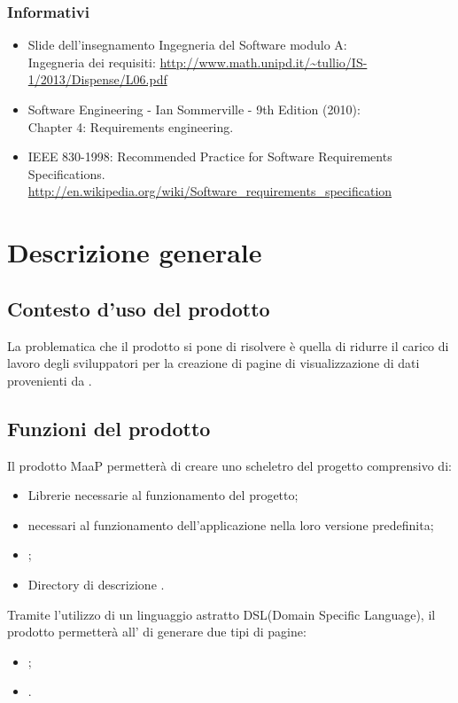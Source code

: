 \subsubsection{Informativi} %
\begin{itemize}
\item Slide dell'insegnamento Ingegneria del Software modulo A:\\
Ingegneria dei requisiti: \url{http://www.math.unipd.it/~tullio/IS-1/2013/Dispense/L06.pdf}
\item Software Engineering - Ian Sommerville - 9th Edition (2010):\\
Chapter 4: Requirements engineering.
\item IEEE 830-1998: Recommended Practice for Software Requirements Specifications.\\
\url{http://en.wikipedia.org/wiki/Software_requirements_specification}
\end{itemize}

\newpage
\section{Descrizione generale}%
\subsection{Contesto d'uso del prodotto} %
La problematica che il prodotto si pone di risolvere è quella di ridurre il carico di lavoro degli sviluppatori per la creazione di pagine  di visualizzazione di dati provenienti da .

\subsection{Funzioni del prodotto} %
Il prodotto MaaP permetterà di creare uno scheletro del progetto comprensivo di:
\begin{itemize}
\item Librerie necessarie al funzionamento del progetto;
\item {} necessari al funzionamento dell'applicazione nella loro versione predefinita;
\item {};
\item Directory di descrizione .
\end{itemize}
Tramite l'utilizzo di un linguaggio astratto DSL(Domain Specific Language), il prodotto permetterà all' di generare due tipi di pagine:
\begin{itemize}
\item {};
\item {}.
\end{itemize}

